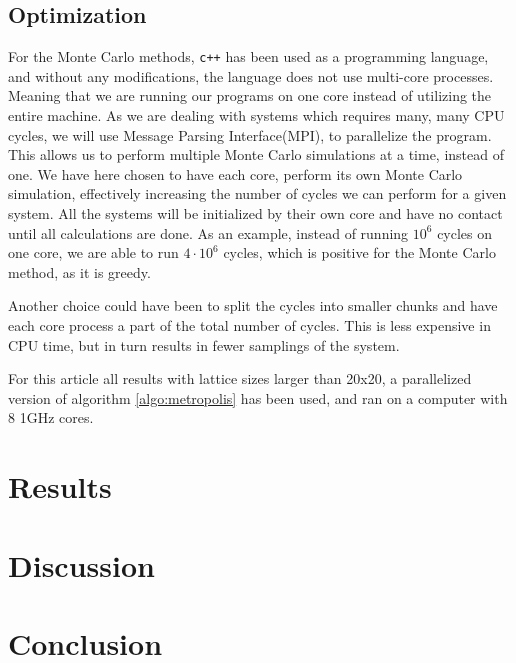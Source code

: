 \documentclass[%
reprint,
nofootinbib,
amsmath,amssymb,
aps,
]{revtex4-1}
\begin{document}
\subsection{Optimization}%
For the Monte Carlo methods, \texttt{c++} has been used as a programming language, and without any modifications, the language does not use multi-core processes. Meaning that we are running our programs on one core instead of utilizing the entire machine. As we are dealing with systems which requires many, many CPU cycles, we will use Message Parsing Interface(MPI), to parallelize the program. This allows us to perform multiple Monte Carlo simulations at a time, instead of one. We have here chosen to have each core, perform its own Monte Carlo simulation, effectively increasing the number of cycles we can perform for a given system. All the systems will be initialized by their own core and have no contact until all calculations are done. As an example, instead of running $10^6$ cycles on one core, we are able to run $4\cdot 10^6$ cycles, which is positive for the Monte Carlo method, as it is greedy. 

Another choice could have been to split the cycles into smaller chunks and have each core process a part of the total number of cycles. This is less expensive in CPU time, but in turn results in fewer samplings of the system.  

For this article all results with lattice sizes larger than 20x20, a parallelized version of algorithm \ref{algo:metropolis} has been used, and ran on a computer with 8 1GHz cores. 
\section{Results}	%

\section{Discussion} %

\section{Conclusion} %



\end{document}
